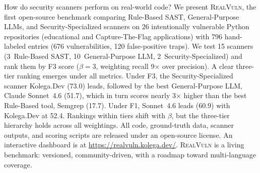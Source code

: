 How do security scanners perform on real-world code? We present \textsc{RealVuln}, the first open-source benchmark comparing Rule-Based SAST, General-Purpose LLMs, and Security-Specialized scanners on 26 intentionally vulnerable Python repositories (educational and Capture-The-Flag applications) with 796 hand-labeled entries (676 vulnerabilities, 120 false-positive traps). We test 15 scanners (3~Rule-Based SAST, 10~General-Purpose LLM, 2~Security-Specialized) and rank them by F3 score ($\beta{=}3$, weighting recall 9$\times$ over precision). A clear three-tier ranking emerges under all metrics. Under F3, the Security-Specialized scanner Kolega.Dev (73.0) leads, followed by the best General-Purpose LLM, Claude Sonnet~4.6 (51.7), which in turn scores nearly 3$\times$ higher than the best Rule-Based tool, Semgrep (17.7). Under F1, Sonnet~4.6 leads (60.9) with Kolega.Dev at 52.4. Rankings within tiers shift with $\beta$, but the three-tier hierarchy holds across all weightings. All code, ground-truth data, scanner outputs, and scoring scripts are released under an open-source license. An interactive dashboard is at \url{https://realvuln.kolega.dev/}. \textsc{RealVuln} is a living benchmark: versioned, community-driven, with a roadmap toward multi-language coverage.
